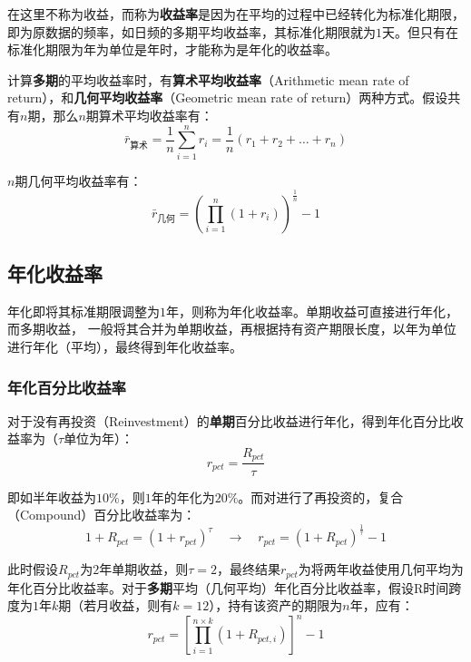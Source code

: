 \documentclass[11pt]{article}
\begin{document}
在这里不称为收益，而称为\textbf{收益率}是因为在平均的过程中已经转化为标准化期限，即为原数据的频率，如日频的多期平均收益率，其标准化期限就为$1$天。但只有在标准化期限为年为单位是年时，才能称为是年化的收益率。

计算\textbf{多期}的平均收益率时，有\textbf{算术平均收益率}（Arithmetic mean rate of return），和\textbf{几何平均收益率}（Geometric mean rate of return）两种方式。假设共有$n$期，那么$n$期算术平均收益率有：
\begin{equation*}
    \bar{r}_{\text{算术}} = \frac{1}{n} \sum^{n}_{i=1} r_i = \frac{1}{n} (r_1 + r_2 + \dots + r_n)
\end{equation*}

$n$期几何平均收益率有：
\begin{equation*}
    \bar{r}_{\text{几何}} = \left( \prod^{n}_{i=1}(1+r_i) \right)^{\frac{1}{n}} - 1
\end{equation*}

\subsection{年化收益率}

年化即将其标准期限调整为$1$年，则称为年化收益率。单期收益可直接进行年化，而多期收益，
一般将其合并为单期收益，再根据持有资产期限长度，以年为单位进行年化（平均），最终得到年化收益率。

\subsubsection*{年化百分比收益率}

对于没有再投资（Reinvestment）的\textbf{单期}百分比收益进行年化，得到年化百分比收益率为（$\tau$单位为年）：
\begin{equation*}
    r_{pct} = \frac{R_{pct}}{\tau}
\end{equation*}

即如半年收益为$10\%$，则$1$年的年化为$20\%$。而对进行了再投资的，复合（Compound）百分比收益率为：
\begin{equation*}
    1+R_{pct} = (1+r_{pct})^\tau \quad\rightarrow\quad
    r_{pct} = (1+R_{pct})^{\frac{1}{\tau}} - 1
\end{equation*}

此时假设$R_{pct}$为$2$年单期收益，则$\tau = 2$，最终结果$r_{pct}$为将两年收益使用几何平均为年化百分比收益率。对于\textbf{多期}平均（几何平均）年化百分比收益率，假设R时间跨度为$1$年$k$期（若月收益，则有$k=12$），持有该资产的期限为$n$年，应有：
\begin{equation*}
    r_{pct} = \left[ \prod_{i=1}^{n\times k} (1+R_{pct,i}) \right]^{n} - 1
\end{equation*}
\end{document}
